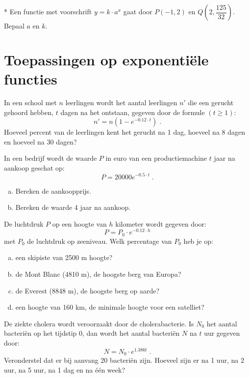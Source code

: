 \documentclass[12pt,twoside]{article}
\begin{document}
\begin{oefening}*
Een functie met voorschrift $y=k\cdot a^x$ gaat door $P(-1,2)$ en $Q(2,\dfrac{125}{32})$. Bepaal $a$ en $k$.
\end{oefening}

\pagebreak
\section{Toepassingen op exponentiële functies}

\begin{oefening}
In een school met $n$ leerlingen wordt het aantal leerlingen $n'$ die een gerucht gehoord hebben, $t$ dagen na het ontstaan, gegeven door de formule $(t\geq 1)$:
$$n' = n(1-e^{-0.12\cdot t})\;.$$
Hoeveel percent van de leerlingen kent het gerucht na 1 dag, hoeveel na 8 dagen en hoeveel na 30 dagen?
\end{oefening}


\begin{oefening}
In een bedrijf wordt de waarde $P$ in euro van een productiemachine $t$ jaar na aankoop geschat op:
$$P = 20000 e^{-0.5\cdot t}\;.$$
\begin{enumerate}[(a)]
  \item Bereken de aankoopprijs.
  \item Bereken de waarde 4 jaar na aankoop.
\end{enumerate}
\end{oefening}

\begin{oefening}
De luchtdruk $P$ op een hoogte van $h$ kilometer wordt gegeven door:
$$P = P_0\cdot e^{-0.12\cdot h}$$
met $P_0$ de luchtdruk op zeeniveau. Welk percentage van $P_0$ heb je op:
\begin{enumerate}[(a)]
  \item een skipiste van 2500 m hoogte?
  \item de Mont Blanc (4810 m), de hoogste berg van Europa?
  \item de Everest (8848 m), de hoogste berg op aarde?
  \item een hoogte van 160 km, de minimale hoogte voor een satelliet?
\end{enumerate}
\end{oefening}

\begin{oefening}
De ziekte cholera wordt veroorzaakt door de cholerabacterie. Is $N_0$ het aantal bacteriën op het tijdstip 0, dan wordt het aantal bacteriën $N$ na $t$ uur gegeven door:
$$N=N_0\cdot e^{1.386 t}\;.$$
Veronderstel dat er bij aanvang 20 bacteriën zijn. Hoeveel zijn er na 1 uur, na 2 uur, na 5 uur, na 1 dag en na één week?
\end{oefening}
\end{document}

